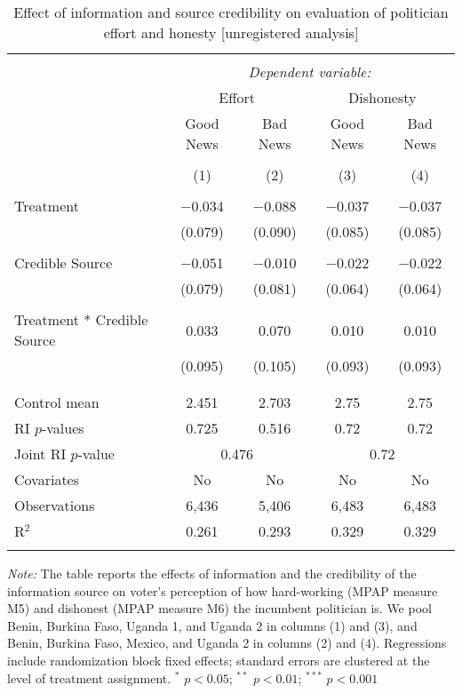 
\begin{table}[!htbp] \centering 
  \caption{Effect of information and source credibility on evaluation of politician effort and honesty [unregistered analysis]} 
  \label{effort_honesty_credibility} 
\begin{tabular}{@{\extracolsep{1pt}}lcccc} 
\\[-1.8ex]\hline 
\hline \\[-1.8ex] 
 & \multicolumn{4}{c}{\textit{Dependent variable:}} \\ 
\cline{2-5} 
& \multicolumn{2}{c}{Effort}&\multicolumn{2}{c}{Dishonesty}\\
\cline{2-5}
 & Good News & Bad News & Good News & Bad News \\ 
\\[-1.8ex] & (1) & (2) & (3) & (4)\\ 
\hline \\[-1.8ex] 
 Treatment & $-$0.034 & $-$0.088 & $-$0.037 & $-$0.037 \\ 
  & (0.079) & (0.090) & (0.085) & (0.085) \\ 
  & & & & \\ 
 Credible Source & $-$0.051 & $-$0.010 & $-$0.022 & $-$0.022 \\ 
  & (0.079) & (0.081) & (0.064) & (0.064) \\ 
  & & & & \\ 
 Treatment * Credible Source & 0.033 & 0.070 & 0.010 & 0.010 \\ 
  & (0.095) & (0.105) & (0.093) & (0.093) \\ 
  & & & & \\ 
\hline \\[-1.8ex] 
Control mean & 2.451 & 2.703 & 2.75 & 2.75 \\ 
RI $p$-values & 0.725 & 0.516 & 0.72 & 0.72 \\ 
Joint RI $p$-value & \multicolumn{2}{c}{0.476} & \multicolumn{2}{c}{0.72} \\
Covariates & No & No & No & No \\ 
Observations & 6,436 & 5,406 & 6,483 & 6,483 \\ 
R$^{2}$ & 0.261 & 0.293 & 0.329 & 0.329 \\ 
\hline 
\hline \\[-1.8ex] 
\end{tabular} 
\begin{flushleft}\textit{Note:} The table reports the effects of information and the credibility of the information source on voter's perception of how hard-working (MPAP measure M5) and dishonest (MPAP measure M6) the incumbent politician is. We pool Benin, Burkina Faso, Uganda 1, and Uganda 2 in columns (1) and (3), and Benin, Burkina Faso, Mexico, and Uganda 2 in columns (2) and (4). Regressions include randomization block fixed effects; standard errors are clustered at the level of treatment assignment. $^*$ $p<0.05$; $^{**}$ $p<0.01$; $^{***}$ $p<0.001$ \end{flushleft}
\end{table} 
